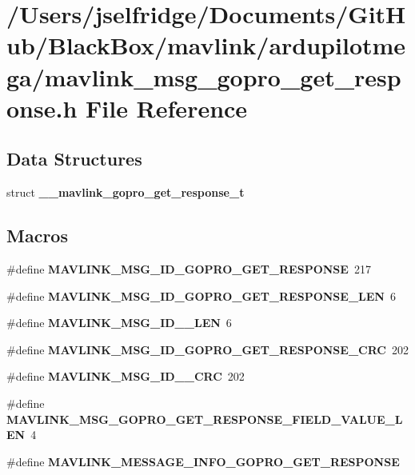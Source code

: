 \section{/\+Users/jselfridge/\+Documents/\+Git\+Hub/\+Black\+Box/mavlink/ardupilotmega/mavlink\+\_\+msg\+\_\+gopro\+\_\+get\+\_\+response.h File Reference}
\label{mavlink__msg__gopro__get__response_8h}
\subsection*{Data Structures}
\begin{DoxyCompactItemize}
\item 
struct \textbf{ \+\_\+\+\_\+mavlink\+\_\+gopro\+\_\+get\+\_\+response\+\_\+t}
\end{DoxyCompactItemize}
\subsection*{Macros}
\begin{DoxyCompactItemize}
\item 
\#define \textbf{ M\+A\+V\+L\+I\+N\+K\+\_\+\+M\+S\+G\+\_\+\+I\+D\+\_\+\+G\+O\+P\+R\+O\+\_\+\+G\+E\+T\+\_\+\+R\+E\+S\+P\+O\+N\+SE}~217
\item 
\#define \textbf{ M\+A\+V\+L\+I\+N\+K\+\_\+\+M\+S\+G\+\_\+\+I\+D\+\_\+\+G\+O\+P\+R\+O\+\_\+\+G\+E\+T\+\_\+\+R\+E\+S\+P\+O\+N\+S\+E\+\_\+\+L\+EN}~6
\item 
\#define \textbf{ M\+A\+V\+L\+I\+N\+K\+\_\+\+M\+S\+G\+\_\+\+I\+D\+\_\+\_\+\+L\+EN}~6
\item 
\#define \textbf{ M\+A\+V\+L\+I\+N\+K\+\_\+\+M\+S\+G\+\_\+\+I\+D\+\_\+\+G\+O\+P\+R\+O\+\_\+\+G\+E\+T\+\_\+\+R\+E\+S\+P\+O\+N\+S\+E\+\_\+\+C\+RC}~202
\item 
\#define \textbf{ M\+A\+V\+L\+I\+N\+K\+\_\+\+M\+S\+G\+\_\+\+I\+D\+\_\+\_\+\+C\+RC}~202
\item 
\#define \textbf{ M\+A\+V\+L\+I\+N\+K\+\_\+\+M\+S\+G\+\_\+\+G\+O\+P\+R\+O\+\_\+\+G\+E\+T\+\_\+\+R\+E\+S\+P\+O\+N\+S\+E\+\_\+\+F\+I\+E\+L\+D\+\_\+\+V\+A\+L\+U\+E\+\_\+\+L\+EN}~4
\item 
\#define \textbf{ M\+A\+V\+L\+I\+N\+K\+\_\+\+M\+E\+S\+S\+A\+G\+E\+\_\+\+I\+N\+F\+O\+\_\+\+G\+O\+P\+R\+O\+\_\+\+G\+E\+T\+\_\+\+R\+E\+S\+P\+O\+N\+SE}
\end{DoxyCompactItemize}
